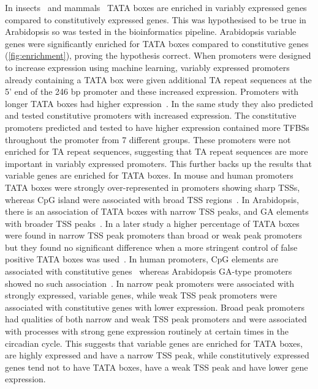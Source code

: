 In insects~\autocite{engstromGenomicRegulatoryBlocks2007} and mammals~\autocite{carninciGenomewideAnalysisMammalian2006} TATA boxes are enriched in variably expressed genes compared to constitutively expressed genes. This was hypothesised to be true in Arabidopsis so was tested in the bioinformatics pipeline. Arabidopsis variable genes were significantly enriched for TATA boxes compared to constitutive genes (\autoref{fig:enrichment}), proving the hypothesis correct.
When promoters were designed to increase expression using machine learning, variably expressed promoters already containing a TATA box were given additional TA repeat sequences at the 5' end of the 246 bp promoter and these increased expression.
Promoters with longer TATA boxes had higher expression~\autocite{kotopkaModeldrivenGenerationArtificial2020}.
In the same study they also predicted and tested constitutive promoters with increased expression.
The constitutive promoters predicted and tested to have higher expression contained more TFBSs throughout the promoter from 7 different groups.
These promoters were not enriched for TA repeat sequences, suggesting that TA repeat sequences are more important in variably expressed promoters.
This further backs up the results that variable genes are enriched for TATA boxes.
In mouse and human promoters TATA boxes were strongly over\hyp{}represented in promoters showing sharp TSSs, whereas CpG island were associated with broad TSS regions~\autocite{carninciGenomewideAnalysisMammalian2006}.
In Arabidopsis, there is an association of TATA boxes with narrow TSS peaks, and GA elements with broader TSS peaks~\autocite{yamamotoHeterogeneityArabidopsisCore2009}.
In a later study a higher percentage of TATA boxes were found in narrow TSS peak promoters than broad or weak peak promoters but they found no significant difference when a more stringent control of false positive TATA boxes was used~\autocite{mortonPairedEndAnalysisTranscription2014}.
In human promoters, CpG elements are associated with constitutive genes~\autocite{schugPromoterFeaturesRelated2005,saxonovGenomewideAnalysisCpG2006} whereas Arabidopsis GA\hyp{}type promoters showed no such association~\autocite{yamamotoHeterogeneityArabidopsisCore2009}.
In \textcite*{mortonPairedEndAnalysisTranscription2014} narrow peak promoters were associated with strongly expressed, variable genes, while weak TSS peak promoters were associated with constitutive genes with lower expression.
Broad peak promoters had qualities of both narrow and weak TSS peak promoters and were associated with processes with strong gene expression routinely at certain times in the circadian cycle.
This suggests that variable genes are enriched for TATA boxes, are highly expressed and have a narrow TSS peak, while constitutively expressed genes tend not to have TATA boxes, have a weak TSS peak and have lower gene expression.


